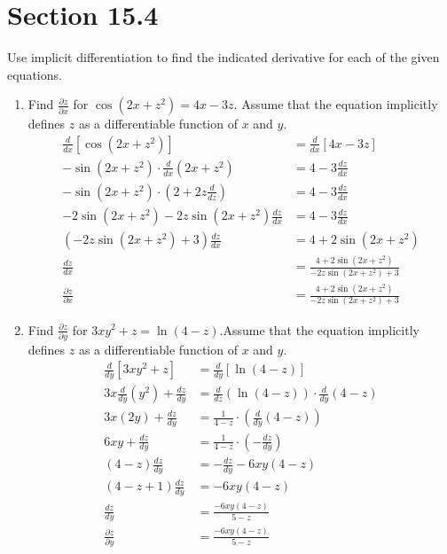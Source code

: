 \documentclass[letter,11pt]{article}
\begin{document}
\section*{Section 15.4} 
Use implicit differentiation to find the indicated derivative for each of the given equations.

\begin{enumerate}[label=\Alph*.]
    \item Find $\frac{\partial z}{\partial x}$ for $\cos(2x + z^2) = 4x - 3z$. Assume that the equation implicitly defines $z$ as a differentiable function of $x$ and $y$.
        \begin{align*}
            \frac{d}{dx}\left[\cos(2x + z^2)\right] &= \frac{d}{dx}\left[4x - 3z\right]\\
             -\sin(2x + z^2) \cdot \frac{d}{dx}(2x + z^2) &= 4 - 3\frac{dz}{dx} \\
             -\sin(2x + z^2) \cdot (2 + 2z \frac{d}{dz}) &= 4 - 3\frac{dz}{dx} \\
             -2\sin(2x + z^2) - 2z\sin(2x + z^2)\frac{dz}{dx} &= 4 - 3\frac{dz}{dx} \\
             \left(-2z\sin(2x + z^2) + 3\right)\frac{dz}{dx} &= 4 + 2\sin(2x + z^2)\\
             \frac{dz}{dx} &= \frac{4 + 2\sin(2x + z^2)}{-2z\sin(2x + z^2) + 3} \\
             \frac{\partial z}{\partial x} &= \frac{4 + 2\sin(2x + z^2)}{-2z\sin(2x + z^2) + 3}
        \end{align*}
    \item Find $\frac{\partial z}{\partial y}$ for $3xy^2+z=\ln(4-z)$.Assume that the equation implicitly defines $z$ as a differentiable function of $x$ and $y$.
    \begin{align*}
        \frac{d}{dy}[3xy^2 + z] &= \frac{d}{dy}\left[\ln(4 - z)\right]\\
        3x\frac{d}{dy}(y^2) + \frac{dz}{dy} &= \frac{d}{dz}\left(\ln(4 - z)\right) \cdot \frac{d}{dy}(4 - z)\\
        3x(2y) + \frac{dz}{dy} &= \frac{1}{4 - z} \cdot \left(\frac{d}{dy}(4 - z)\right) \\
        6xy + \frac{dz}{dy} &= \frac{1}{4 - z} \cdot (-\frac{dz}{dy}) \\
        (4 - z)\frac{dz}{dy} &= -\frac{dz}{dy} - 6xy(4 - z) \\
        (4 - z + 1)\frac{dz}{dy} &= - 6xy(4 - z)\\
        \frac{dz}{dy} &= \frac{- 6xy(4 - z)}{5 - z}\\
         \frac{\partial z}{\partial y} &= \frac{- 6xy(4 - z)}{5 - z}
\end{align*}
\end{enumerate}
\newpage
\end{document}

